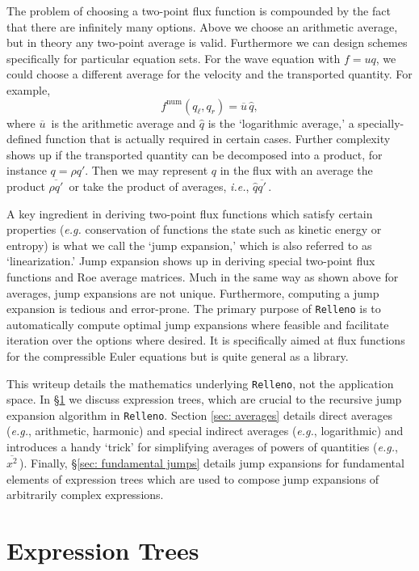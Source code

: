 \documentclass[10pt]{article}
\newcommand{\num}{\mathrm{num}}
\newcommand{\avg}[1]{\overline{#1}\,}
\newcommand{\logavg}[1]{\widehat{#1}}
\newcommand{\Relleno}{\texttt{Relleno}}
\begin{document}
The problem of choosing a two-point flux function is compounded by the fact that there are infinitely many options.
Above we choose an arithmetic average, but in theory any two-point average is valid.
Furthermore we can design schemes specifically for particular equation sets.
For the wave equation with $f=uq$, we could choose a different average for the velocity and the transported quantity.
For example,
\begin{equation}
	f^\num(q_\ell,q_r) = \avg{u}\logavg{q},
\end{equation}
where $\avg{u}$ is the arithmetic average and $\logavg{q}$ is the `logarithmic average,' a specially-defined function that is actually required in certain cases.
Further complexity shows up if the transported quantity can be decomposed into a product, for instance $q=\rho q'$.
Then we may represent $q$ in the flux with an average the product $\avg{\rho q'}$ or take the product of averages, \emph{i.e.}, $\logavg{q}\avg{q'}$.

A key ingredient in deriving two-point flux functions which satisfy certain properties (\emph{e.g.} conservation of functions the state such as kinetic energy or entropy) is what we call the `jump expansion,' which is also referred to as `linearization.'
Jump expansion shows up in deriving special two-point flux functions and Roe average matrices.
Much in the same way as shown above for averages, jump expansions are not unique.
Furthermore, computing a jump expansion is tedious and error-prone.
The primary purpose of \Relleno{} is to automatically compute optimal jump expansions where feasible and facilitate iteration over the options where desired.
It is specifically aimed at flux functions for the compressible Euler equations but is quite general as a library.

This writeup details the mathematics underlying \Relleno{}, not the application space.
In \S\ref{sec: expression trees} we discuss expression trees, which are crucial to the recursive jump expansion algorithm in \Relleno{}.
Section \ref{sec: averages} details direct averages (\emph{e.g.}, arithmetic, harmonic) and special indirect averages (\emph{e.g.}, logarithmic) and introduces a handy `trick' for simplifying averages of powers of quantities (\emph{e.g.}, $\avg{x^2}$).
Finally, \S\ref{sec: fundamental jumps} details jump expansions for fundamental elements of expression trees which are used to compose jump expansions of arbitrarily complex expressions.


\section{Expression Trees} \label{sec: expression trees}
\end{document}
